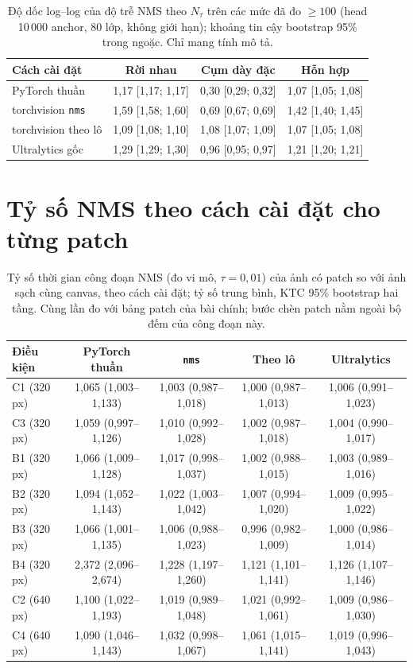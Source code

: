 \documentclass[11pt,a4paper]{article}
\newcommand{\Ntau}{N_{\tau}}
\begin{document}
\begin{table}[t]
\centering\small
\caption{Độ dốc log--log của độ trễ NMS theo $\Ntau$ trên các mức đã đo $\ge 100$ (head 10\,000 anchor, 80 lớp, không giới hạn); khoảng tin cậy bootstrap 95\% trong ngoặc. Chỉ mang tính mô tả.}
\label{tab:slopes}
\begin{tabular}{@{}lccc@{}}
\toprule
Cách cài đặt & Rời nhau & Cụm dày đặc & Hỗn hợp \\
\midrule
PyTorch thuần & 1,17 [1,17; 1,17] & 0,30 [0,29; 0,32] & 1,07 [1,05; 1,08] \\
torchvision \texttt{nms} & 1,59 [1,58; 1,60] & 0,69 [0,67; 0,69] & 1,42 [1,40; 1,45] \\
torchvision theo lô & 1,09 [1,08; 1,10] & 1,08 [1,07; 1,09] & 1,07 [1,05; 1,08] \\
Ultralytics gốc & 1,29 [1,29; 1,30] & 0,96 [0,95; 0,97] & 1,21 [1,20; 1,21] \\
\bottomrule
\end{tabular}
\end{table}

\section{Tỷ số NMS theo cách cài đặt cho từng patch}
\begin{table}[t]
\centering\small
\caption{Tỷ số thời gian công đoạn NMS (đo vi mô, $\tau=0{,}01$) của ảnh có patch so với ảnh sạch cùng canvas, theo cách cài đặt; tỷ số trung bình, KTC 95\% bootstrap hai tầng. Cùng lần đo với bảng patch của bài chính; bước chèn patch nằm ngoài bộ đếm của công đoạn này.}
\label{tab:impl}
\begin{tabular}{@{}lcccc@{}}
\toprule
Điều kiện & PyTorch thuần & \texttt{nms} & Theo lô & Ultralytics \\
\midrule
C1 (320 px) & 1,065 (1,003--1,133) & 1,003 (0,987--1,018) & 1,000 (0,987--1,013) & 1,006 (0,991--1,023) \\
C3 (320 px) & 1,059 (0,997--1,126) & 1,010 (0,992--1,028) & 1,002 (0,987--1,018) & 1,004 (0,990--1,017) \\
B1 (320 px) & 1,066 (1,009--1,128) & 1,017 (0,998--1,037) & 1,002 (0,988--1,015) & 1,003 (0,989--1,016) \\
B2 (320 px) & 1,094 (1,052--1,143) & 1,022 (1,003--1,042) & 1,007 (0,994--1,020) & 1,009 (0,995--1,022) \\
B3 (320 px) & 1,066 (1,001--1,135) & 1,006 (0,988--1,023) & 0,996 (0,982--1,009) & 1,000 (0,986--1,014) \\
B4 (320 px) & 2,372 (2,096--2,674) & 1,228 (1,197--1,260) & 1,121 (1,101--1,141) & 1,126 (1,107--1,146) \\
C2 (640 px) & 1,100 (1,022--1,193) & 1,019 (0,989--1,048) & 1,021 (0,992--1,061) & 1,009 (0,986--1,030) \\
C4 (640 px) & 1,090 (1,046--1,143) & 1,032 (0,998--1,067) & 1,061 (1,015--1,141) & 1,019 (0,996--1,043) \\
\bottomrule
\end{tabular}
\end{table}
\end{document}
